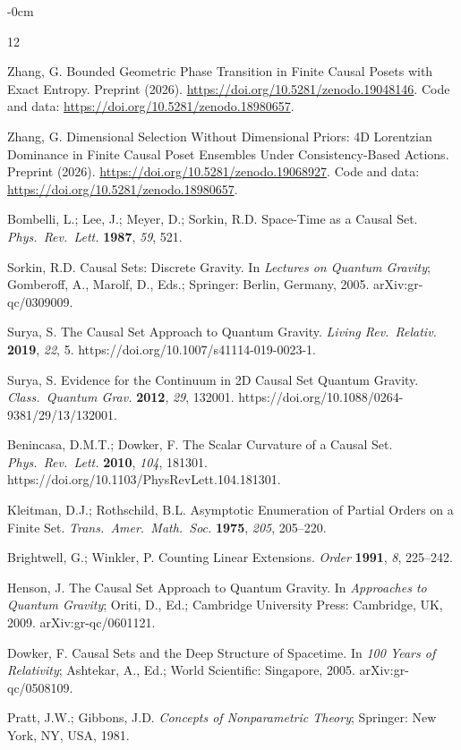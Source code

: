 \documentclass[entropy,article,submit,pdftex,moreauthors]{Definitions/mdpi}
\begin{document}
\begin{adjustwidth}{-\extralength}{0cm}


\begin{thebibliography}{12}

Zhang, G.
Bounded Geometric Phase Transition in Finite Causal Posets with Exact Entropy.
Preprint (2026). \url{https://doi.org/10.5281/zenodo.19048146}.
Code and data: \url{https://doi.org/10.5281/zenodo.18980657}.

Zhang, G.
Dimensional Selection Without Dimensional Priors: 4D Lorentzian Dominance in Finite Causal Poset Ensembles Under Consistency-Based Actions.
Preprint (2026). \url{https://doi.org/10.5281/zenodo.19068927}.
Code and data: \url{https://doi.org/10.5281/zenodo.18980657}.

Bombelli, L.; Lee, J.; Meyer, D.; Sorkin, R.D.
Space-Time as a Causal Set.
\textit{Phys.\ Rev.\ Lett.} \textbf{1987}, \textit{59}, 521.

Sorkin, R.D.
Causal Sets: Discrete Gravity.
In \textit{Lectures on Quantum Gravity}; Gomberoff, A., Marolf, D., Eds.; Springer: Berlin, Germany, 2005.
arXiv:gr-qc/0309009.

Surya, S.
The Causal Set Approach to Quantum Gravity.
\textit{Living Rev.\ Relativ.} \textbf{2019}, \textit{22}, 5.
https://doi.org/10.1007/s41114-019-0023-1.

Surya, S.
Evidence for the Continuum in 2D Causal Set Quantum Gravity.
\textit{Class.\ Quantum Grav.} \textbf{2012}, \textit{29}, 132001.
https://doi.org/10.1088/0264-9381/29/13/132001.

Benincasa, D.M.T.; Dowker, F.
The Scalar Curvature of a Causal Set.
\textit{Phys.\ Rev.\ Lett.} \textbf{2010}, \textit{104}, 181301.
https://doi.org/10.1103/PhysRevLett.104.181301.

Kleitman, D.J.; Rothschild, B.L.
Asymptotic Enumeration of Partial Orders on a Finite Set.
\textit{Trans.\ Amer.\ Math.\ Soc.} \textbf{1975}, \textit{205}, 205--220.

Brightwell, G.; Winkler, P.
Counting Linear Extensions.
\textit{Order} \textbf{1991}, \textit{8}, 225--242.

Henson, J.
The Causal Set Approach to Quantum Gravity.
In \textit{Approaches to Quantum Gravity}; Oriti, D., Ed.; Cambridge University Press: Cambridge, UK, 2009.
arXiv:gr-qc/0601121.

Dowker, F.
Causal Sets and the Deep Structure of Spacetime.
In \textit{100 Years of Relativity}; Ashtekar, A., Ed.; World Scientific: Singapore, 2005.
arXiv:gr-qc/0508109.

Pratt, J.W.; Gibbons, J.D.
\textit{Concepts of Nonparametric Theory}; Springer: New York, NY, USA, 1981.

\end{thebibliography}

\end{adjustwidth}
\end{document}
